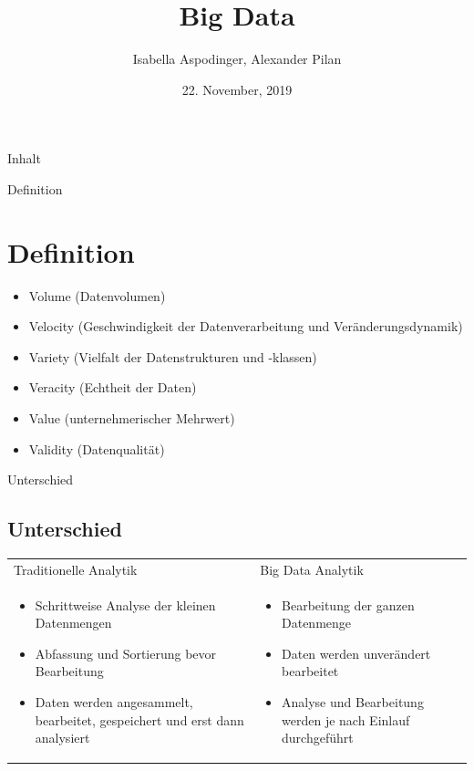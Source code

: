 \documentclass[11pt]{beamer}
\author{Isabella Aspodinger, Alexander Pilan}
\title{Big Data}
\institute{Paris Lodron Universität Salzburg}
\date{22. November, 2019}
\begin{document}
\begin{frame}
\titlepage
\end{frame}

\begin{frame}{Inhalt}
\tableofcontents
\end{frame}


\begin{frame}{Definition}
\section{Definition}
\begin{itemize}
\item Volume (Datenvolumen)
\item Velocity (Geschwindigkeit der Datenverarbeitung und Veränderungsdynamik)
\item Variety (Vielfalt der Datenstrukturen und -klassen)
\item Veracity (Echtheit der Daten)
\item Value (unternehmerischer Mehrwert)
\item Validity (Datenqualität)
\end{itemize}
\end{frame}

\begin{frame}{Unterschied}
\subsection{Unterschied}
\setlength\tabcolsep{0pt}
\setlength\thickmuskip{0mu}
\setlength\medmuskip{0mu}
\small
\centering
\begin{tabular*}{\textwidth}{ p{145pt} p{145pt}} 
Traditionelle Analytik & Big Data Analytik \\ 
\begin{itemize}
\item Schrittweise Analyse der kleinen Datenmengen
\item Abfassung und Sortierung bevor Bearbeitung
\item Daten werden angesammelt, bearbeitet, gespeichert und erst dann analysiert 
\end{itemize}

&
\begin{itemize}
\item Bearbeitung der ganzen Datenmenge 
\item Daten werden unverändert bearbeitet
\item Analyse und Bearbeitung werden je nach Einlauf durchgeführt 
\end{itemize}

\end{tabular*} 

\end{frame}
\end{document}
